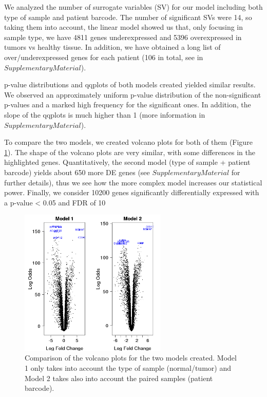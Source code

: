 \documentclass[9pt,twocolumn,twoside]{gsajnl}
\begin{document}
We analyzed the number of surrogate variables (SV) for our model including both type of sample and patient barcode. The number of significant SVs were 14, so taking them into account, the linear model showed us that, only focusing in sample type, we have 4811 genes underexpressed and 5396 overexpressed in tumors vs healthy tissue. In addition, we have obtained a long list of over/underexpressed genes for each patient (106 in total, see in $Supplementary Material$).
\vspace{2mm}

p-value distributions and qqplots of both models created yielded similar results. We observed an approximately uniform p-value distribution of the non-significant p-values and a marked high frequency for the significant ones. In addition, the slope of the qqplots is much higher than 1 (more information in $Supplementary Material$). 
\vspace{2mm}

To compare the two models, we created volcano plots for both of them (Figure \ref{fig:spectrum}). The shape of the volcano plots are very similar, with some differences in the highlighted genes. Quantitatively, the second model (type of sample + patient barcode) yields about 650 more DE genes (see $Supplementary Material$ for further details), thus we see how the more complex model increases our statistical power. Finally, we consider 10200 genes significantly differentially expressed with a p-value < 0.05 and FDR of 10%

\begin{figure}[htbp]
\centering
\includegraphics[width=70mm]{volcanotex-1}
\caption{Comparison of the volcano plots for the two models created. Model 1 only takes into account the type of sample (normal/tumor) and Model 2 takes also into account the paired samples (patient barcode).}%
\label{fig:spectrum}
\end{figure}
\end{document}
